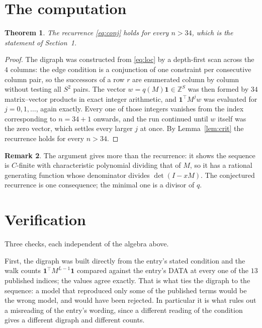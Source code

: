 \documentclass[11pt,a4paper]{article}
\theoremstyle{plain}
\newtheorem{theorem}{Theorem}
\theoremstyle{definition}
\newtheorem{remark}[theorem]{Remark}
\begin{document}
\section{The computation}

\begin{theorem}
The recurrence \eqref{eq:conj} holds for every $n>34$, which is the statement of
Section~1.
\end{theorem}

\begin{proof}
The digraph was constructed from \eqref{eq:loc} by a depth-first scan across the $4$
columns: the edge condition is a conjunction of one constraint per consecutive column
pair, so the successors of a row $r$ are enumerated column by column without testing all
$S^2$ pairs. The vector $w=q(M)\mathbf{1}\in\mathbb{Z}^{S}$ was then formed by $34$
matrix--vector products in exact integer arithmetic, and $\mathbf{1}^{\!\top}M^{j}w$ was
evaluated for $j=0,1,\dots$, again exactly. Every one of those integers vanishes from the
index corresponding to $n=34+1$ onwards, and the run continued until $w$ itself was the
zero vector, which settles every larger $j$ at once. By Lemma~\ref{lem:crit} the recurrence
holds for every $n>34$.
\end{proof}

\begin{remark}
The argument gives more than the recurrence: it shows the sequence is $C$-finite with
characteristic polynomial dividing that of $M$, so it has a rational generating function
whose denominator divides $\det(I-xM)$. The conjectured recurrence is one consequence; the
minimal one is a divisor of $q$.
\end{remark}

\section{Verification}

Three checks, each independent of the algebra above.

First, the digraph was built directly from the entry's stated condition and the walk counts
$\mathbf{1}^{\!\top}M^{L-1}\mathbf{1}$ compared against the entry's DATA at
every one of the $13$ published indices; the values agree exactly. That is what ties
the digraph to the sequence: a model that reproduced only some of the published terms would
be the wrong model, and would have been rejected. In particular it is what rules out a
misreading of the entry's wording, since a different reading of the condition gives a
different digraph and different counts.
\end{document}
